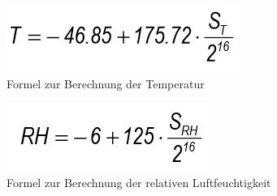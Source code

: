 \documentclass[]{article}
\begin{document}
\begin{figure}[h]
	\centering
	\includegraphics[scale=0.60]{images/sht21_tempformula}
	\caption{Formel zur Berechnung der Temperatur~\cite{datasheetsht21}}
	\label{img:sht21_tempformula}
\end{figure}
\begin{figure}[h]
	\centering
	\includegraphics[scale=0.60]{images/sht21_rhformula}
	\caption{Formel zur Berechnung der relativen Luftfeuchtigkeit~\cite{datasheetsht21}}
	\label{img:sht21_rhformula}
\end{figure}
\end{document}
